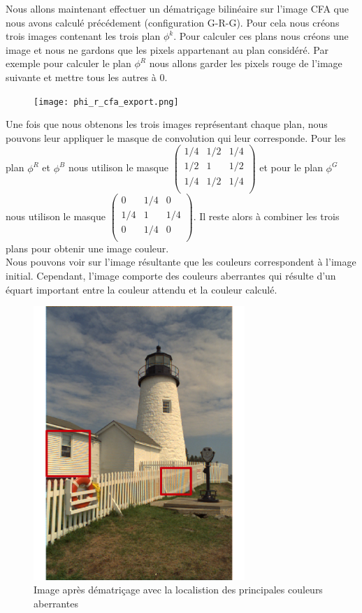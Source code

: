 \documentclass[a4paper,11pt]{article}
\begin{document}
  Nous allons maintenant effectuer un dématriçage bilinéaire sur l'image CFA que nous avons calculé
  précédement (configuration G-R-G). Pour cela nous créons trois images contenant les trois plan $\phi^k$.
  Pour calculer ces plans nous créons une image et nous ne gardons que les pixels appartenant au plan considéré.
  Par exemple pour calculer le plan $\phi^R$ nous allons garder les pixels rouge de l'image suivante et mettre tous 
  les autres à 0.
  
  \begin{figure}[H]
  \center
   \texttt{[image: phi\_r\_cfa\_export.png]}
  \end{figure}

  Une fois que nous obtenons les trois images représentant chaque plan, nous pouvons leur appliquer le masque de
  convolution qui leur corresponde. Pour les plan $\phi^R$ et $\phi^B$ nous utilison le masque 
  $\begin{pmatrix}
    1/4 & 1/2 & 1/4\\
    1/2 & 1 & 1/2\\
    1/4 & 1/2 & 1/4\\
   \end{pmatrix}$ et pour le plan $\phi^G$ nous utilison le masque 
   $\begin{pmatrix}
    0 & 1/4 & 0\\
    1/4 & 1 & 1/4\\
    0 & 1/4 & 0\\
   \end{pmatrix}$.
   Il reste alors à combiner les trois plans pour obtenir une image couleur.\\
   
   Nous pouvons voir sur l'image résultante que les couleurs correspondent à l'image initial. Cependant,
   l'image comporte des couleurs aberrantes qui résulte d'un équart important entre la couleur attendu
   et la couleur calculé.

  \begin{figure}[H]
  \center
   \includegraphics[width=8cm]{../result2ROI.png}
   \caption{Image après dématriçage avec la localistion des principales couleurs aberrantes}
  \end{figure}
   
\end{document}
